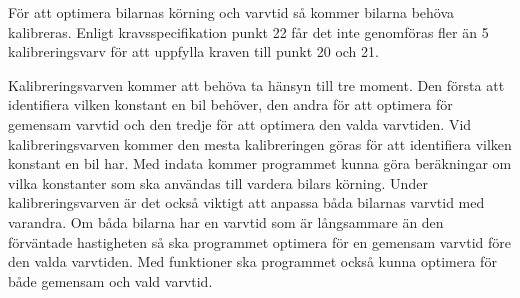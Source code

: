 För att optimera bilarnas körning och varvtid så kommer bilarna behöva
kalibreras. Enligt kravsspecifikation punkt 22 får det inte genomföras fler än
5 kalibreringsvarv för att uppfylla kraven till punkt 20 och 21.

Kalibreringsvarven kommer att behöva ta hänsyn till tre moment. Den första att
identifiera vilken konstant en bil behöver, den andra för att optimera för
gemensam varvtid och den tredje för att optimera den valda varvtiden. Vid
kalibreringsvarven kommer den mesta kalibreringen göras för att identifiera
vilken konstant en bil har. Med indata kommer programmet kunna göra beräkningar
om vilka konstanter som ska användas till vardera bilars körning. Under
kalibreringsvarven är det också viktigt att anpassa båda bilarnas varvtid med
varandra. Om båda bilarna har en varvtid som är långsammare än den förväntade
hastigheten så ska programmet optimera för en gemensam varvtid före den valda
varvtiden. Med funktioner ska programmet också kunna optimera för både
gemensam och vald varvtid.

